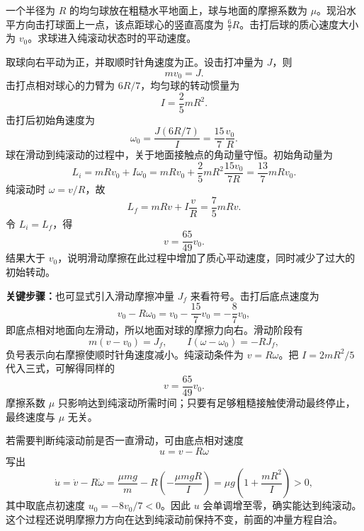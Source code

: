 \begin{question}[击打均匀球后的纯滚动]
一个半径为 $R$ 的均匀球放在粗糙水平地面上，球与地面的摩擦系数为 $\mu$。现沿水平方向击打球面上一点，该点距球心的竖直高度为 $\frac{6}{7}R$。击打后球的质心速度大小为 $v_0$。求球进入纯滚动状态时的平动速度。

\begin{solution}
取球向右平动为正，并取顺时针角速度为正。设击打冲量为 $J$，则
\[
  mv_0=J.
\]
击打点相对球心的力臂为 $6R/7$，均匀球的转动惯量为
\[
  I=\frac25mR^2.
\]
击打后初始角速度为
\[
  \omega_0=\frac{J(6R/7)}{I}
  =\frac{15}{7}\frac{v_0}{R}.
\]
球在滑动到纯滚动的过程中，关于地面接触点的角动量守恒。初始角动量为
\[
  L_i=mRv_0+I\omega_0
  =mRv_0+\frac25mR^2\frac{15v_0}{7R}
  =\frac{13}{7}mRv_0 .
\]
纯滚动时 $\omega=v/R$，故
\[
  L_f=mRv+I\frac{v}{R}
      =\frac75mRv .
\]
令 $L_i=L_f$，得
\[
  \boxed{v=\frac{65}{49}v_0}.
\]
结果大于 $v_0$，说明滑动摩擦在此过程中增加了质心平动速度，同时减少了过大的初始转动。


\medskip
\textbf{关键步骤：}也可显式引入滑动摩擦冲量 $J_f$ 来看符号。击打后底点速度为
\[
  v_0-R\omega_0=v_0-\frac{15}{7}v_0=-\frac87v_0,
\]
即底点相对地面向左滑动，所以地面对球的摩擦力向右。滑动阶段有
\[
  m(v-v_0)=J_f,
  \qquad
  I(\omega-\omega_0)=-RJ_f,
\]
负号表示向右摩擦使顺时针角速度减小。纯滚动条件为 $v=R\omega$。把 $I=2mR^2/5$ 代入三式，可解得同样的
\[
  v=\frac{65}{49}v_0.
\]
摩擦系数 $\mu$ 只影响达到纯滚动所需时间；只要有足够粗糙接触使滑动最终停止，最终速度与 $\mu$ 无关。


\medskip
若需要判断纯滚动前是否一直滑动，可由底点相对速度
\[
  u=v-R\omega
\]
写出
\[
  \dot u=\dot v-R\dot\omega=\frac{\mu mg}{m}-R\left(-\frac{\mu mgR}{I}\right)
  =\mu g\left(1+\frac{mR^2}{I}\right)>0,
\]
其中取底点初速度 $u_0=-8v_0/7<0$。因此 $u$ 会单调增至零，确实能达到纯滚动。这个过程还说明摩擦力方向在达到纯滚动前保持不变，前面的冲量方程自洽。
\end{solution}
\end{question}

